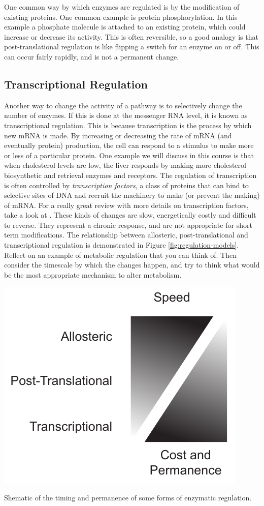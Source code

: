 \documentclass{tufte-handout}
\begin{document}
One common way by which enzymes are regulated is by the modification of existing proteins.  One common example is protein phosphorylation.  In this example a phosphate molecule is attached to an existing protein, which could increase or decrease its activity.  This is often reversible, so a good analogy is that post-translational regulation is like flipping a switch for an enzyme on or off.  This can occur fairly rapidly, and is not a permanent change.

\subsection{Transcriptional Regulation}

Another way to change the activity of a pathway is to selectively change the number of enzymes.  If this is done at the messenger RNA level, it is known as transcriptional regulation.  This is because transcription is the process by which new mRNA is made.  By increasing or decreasing the rate of mRNA (and eventually protein) production, the cell can respond to a stimulus to make more or less of a particular protein.  One example we will discuss in this course is that when cholesterol levels are low, the liver responds by making more cholesterol biosynthetic and retrieval enzymes and receptors.  The regulation of transcription is often controlled by \emph{transcription factors}, a class of proteins that can bind to selective sites of DNA and recruit the machinery to make (or prevent the making) of mRNA.  For a really great review with more details on transcription factors, take a look at \citet{Lambert2018}.  These kinds of changes are slow, energetically costly and difficult to reverse.  They represent a chronic response, and are not appropriate for short term modifications.  The relationship between allosteric, post-translational and transcriptional regulation is demonstrated in Figure \ref{fig:regulation-models}.  Reflect on an example of metabolic regulation that you can think of.  Then consider the timescale by which the changes happen, and try to think what would be the most appropriate mechanism to alter metabolism.

\begin{marginfigure}
\includegraphics{figures/regulation-models}
\caption{Shematic of the timing and permanence of some forms of enzymatic regulation.}
\label{fig:regulation-models}
\end{marginfigure}




\end{document}
